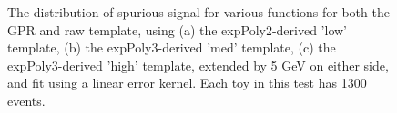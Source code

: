 \begin{figure} 
\begin{center}

\caption{The distribution of spurious signal for various functions for both the GPR and raw template, using (a) the expPoly2-derived 'low' template, (b) the expPoly3-derived 'med' template, (c) the expPoly3-derived 'high' template, extended by 5 GeV on either side, and fit using a linear error kernel. Each toy in this test has 1300 events.}
\label{fig:linearkernel_lowpt_1300_noSig}
\end{center}
\end{figure}

